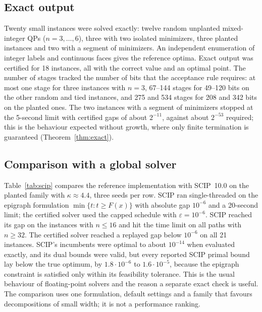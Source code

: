 \subsection{Exact output}
Twenty small instances were solved exactly: twelve random unplanted
mixed-integer QPs ($n=3,\dots,6$), three with two isolated minimizers, three
planted instances and two with a segment of minimizers. An independent
enumeration of integer labels and continuous faces gives the reference
optima. Exact output was certified for 18 instances, all with the correct value
and an optimal point. The number of stages tracked the number of bits that the
acceptance rule requires: at most one stage for three instances with $n=3$,
67--144 stages for 49--120 bits on the other random and tied instances, and 275
and 534 stages for 208 and 342 bits on the planted ones. The two instances with
a segment of minimizers stopped at the 5-second limit with certified gaps of
about $2^{-11}$, against about $2^{-53}$ required; this is the behaviour
expected without growth, where only finite termination is guaranteed
(Theorem~\ref{thm:exact}).

\subsection{Comparison with a global solver}
Table~\ref{tab:scip} compares the reference implementation with SCIP~10.0
\cite{VigerskeGleixner2018,BestuzhevaEtAl2023} on the planted family with $\kappa\approx4.4$, three seeds
per row. SCIP ran single-threaded on the epigraph formulation
$\min\{t:t\ge F(x)\}$ with absolute gap $10^{-6}$ and a 20-second limit; the
certified solver used the capped schedule with $\varepsilon=10^{-6}$. SCIP
reached its gap on the instances with $n\le16$ and hit the time limit on all
paths with $n\ge32$. The certified solver reached a replayed gap below $10^{-6}$
on all 21 instances. SCIP's incumbents were optimal to about $10^{-14}$ when
evaluated exactly, and its dual bounds were valid, but every reported SCIP
primal bound lay below the true optimum, by $1.8\cdot10^{-6}$ to
$1.6\cdot10^{-5}$, because the epigraph constraint is satisfied only within its
feasibility tolerance. This is the usual behaviour of floating-point solvers
and the reason a separate exact check is useful. The comparison uses one
formulation, default settings and a family that favours decompositions of
small width; it is not a performance ranking.

